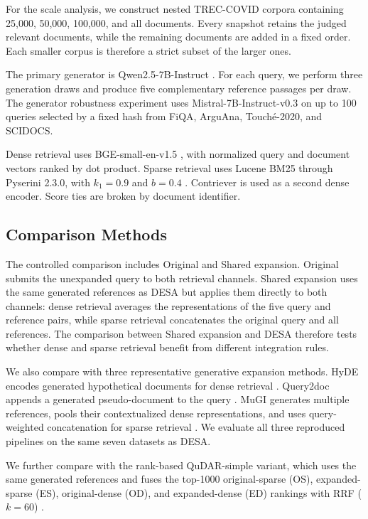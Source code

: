 For the scale analysis, we construct nested TREC-COVID corpora containing
25,000, 50,000, 100,000, and all documents. Every snapshot retains the judged
relevant documents, while the remaining documents are added in a fixed order.
Each smaller corpus is therefore a strict subset of the larger ones.

The primary generator is Qwen2.5-7B-Instruct
\citep{qwen-team-2024-qwen25}. For each query, we perform three generation
draws and produce five complementary reference passages per draw. The generator
robustness experiment uses Mistral-7B-Instruct-v0.3
\citep{jiang-etal-2023-mistral} on up to 100 queries selected by a fixed hash
from FiQA, ArguAna, Touch\'e-2020, and SCIDOCS.

Dense retrieval uses BGE-small-en-v1.5 \citep{xiao-etal-2024-cpack}, with
normalized query and document vectors ranked by dot product. Sparse retrieval
uses Lucene BM25 through Pyserini 2.3.0, with $k_1=0.9$ and $b=0.4$
\citep{robertson-zaragoza-2009-bm25,lin-etal-2021-pyserini}. Contriever
\citep{izacard-etal-2022-contriever} is used as a second dense encoder. Score
ties are broken by document identifier.

\subsection{Comparison Methods}

The controlled comparison includes Original and Shared expansion. Original
submits the unexpanded query to both retrieval channels. Shared expansion uses
the same generated references as DESA but applies them directly to both
channels: dense retrieval averages the representations of the five query and
reference pairs, while sparse retrieval concatenates the original query and all
references. The comparison between Shared expansion and DESA therefore tests
whether dense and sparse retrieval benefit from different integration rules.

We also compare with three representative generative expansion methods. HyDE
encodes generated hypothetical documents for dense retrieval
\citep{gao-etal-2023-precise}. Query2doc appends a generated pseudo-document to
the query \citep{wang-etal-2023-query2doc}. MuGI generates multiple references,
pools their contextualized dense representations, and uses query-weighted
concatenation for sparse retrieval \citep{zhang-etal-2024-exploring-best}.
We evaluate all three reproduced pipelines on the same seven datasets as DESA.

We further compare with the rank-based QuDAR-simple variant, which uses the
same generated references and fuses the top-1000 original-sparse (OS),
expanded-sparse (ES), original-dense (OD), and expanded-dense (ED) rankings
with RRF ($k=60$) \citep{kim-etal-2026-qudar}.

